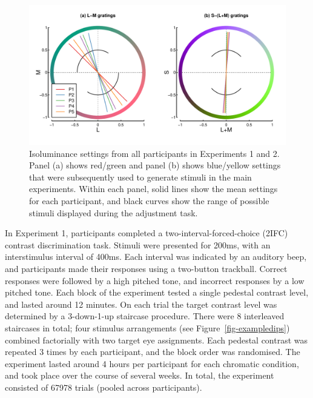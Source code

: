 \documentclass[
  letterpaper,
  DIV=11,
  numbers=noendperiod]{scrartcl}
\begin{document}
\begin{figure}

{\centering \includegraphics{Figures/isosettings.pdf}

}

\caption{\label{fig-isofig}Isoluminance settings from all participants
in Experiments 1 and 2. Panel (a) shows red/green and panel (b) shows
blue/yellow settings that were subsequently used to generate stimuli in
the main experiments. Within each panel, solid lines show the mean
settings for each participant, and black curves show the range of
possible stimuli displayed during the adjustment task.}

\end{figure}

In Experiment 1, participants completed a two-interval-forced-choice
(2IFC) contrast discrimination task. Stimuli were presented for 200ms,
with an interstimulus interval of 400ms. Each interval was indicated by
an auditory beep, and participants made their responses using a
two-button trackball. Correct responses were followed by a high pitched
tone, and incorrect responses by a low pitched tone. Each block of the
experiment tested a single pedestal contrast level, and lasted around 12
minutes. On each trial the target contrast level was determined by a
3-down-1-up staircase procedure. There were 8 interleaved staircases in
total; four stimulus arrangements (see Figure~\ref{fig-exampledips})
combined factorially with two target eye assignments. Each pedestal
contrast was repeated 3 times by each participant, and the block order
was randomised. The experiment lasted around 4 hours per participant for
each chromatic condition, and took place over the course of several
weeks. In total, the experiment consisted of 67978 trials (pooled across
participants).
\end{document}
